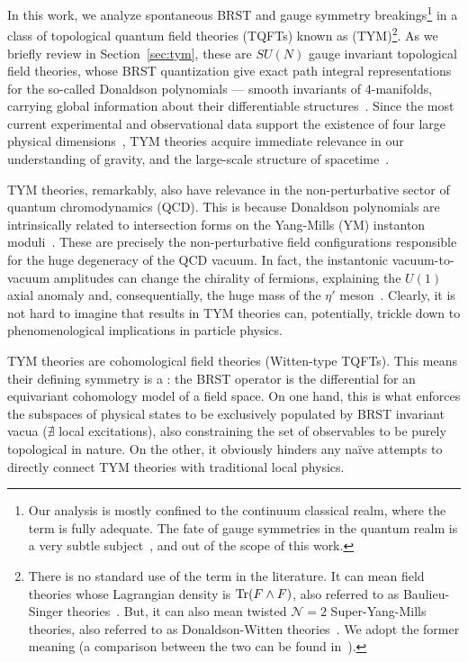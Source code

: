 \documentclass[../main.tex]{subfiles}
\begin{document}
In this work, we analyze spontaneous BRST and gauge symmetry breakings\footnote{Our analysis is mostly confined to the continuum classical realm, where the term  is fully adequate. The fate of gauge symmetries in the quantum realm is a very subtle subject~\cite{elitzur1975a,frohlich1980a,frohlich1981a,maas2019a}, and out of the scope of this work.} in a class of topological quantum field theories (TQFTs) known as  (TYM)\footnote{There is no standard use of the term  in the literature. It can mean field theories whose Lagrangian density is $\operatorname{Tr} (F \wedge F)$, also referred to as Baulieu-Singer theories~\cite{baulieu1988a}. But, it can also mean twisted $\mathcal{N}=2$ Super-Yang-Mills theories, also referred to as Donaldson-Witten theories~\cite{witten1988d,witten1991a}. We adopt the former meaning (a comparison between the two can be found in~\cite{junqueira2021a}).}. As we briefly review in Section~\ref{sec:tym}, these are $SU(N)$ gauge invariant topological field theories, whose BRST quantization give exact path integral representations for the so-called Donaldson polynomials --- smooth invariants of 4-manifolds, carrying global information about their differentiable structures~\cite{donaldson1983a,donaldson1990a,donaldson1990b,witten1988d,baulieu1988a,witten1991a}. Since the most current experimental and observational data support the existence of four large physical dimensions~\cite{lee2020a,wenhai2020a,chakravarti2020a,visinelli2018a,vagnozzi2019a}, TYM theories acquire immediate relevance in our understanding of gravity, and the large-scale structure of spacetime~\cite{witten1988a,brans1992,maluga1996,maluga2007}.

TYM theories, remarkably, also have relevance in the non-perturbative sector of quantum chromodynamics (QCD). This is because Donaldson polynomials are intrinsically related to intersection forms on the Yang-Mills (YM) instanton moduli~\cite{donaldson1983a,donaldson1990a,donaldson1990b}. These are precisely the non-perturbative field configurations responsible for the huge degeneracy of the QCD vacuum. In fact, the instantonic vacuum-to-vacuum amplitudes can change the chirality of fermions, explaining the $U(1)$ axial anomaly and, consequentially, the huge mass of the $\eta '$ meson~\cite{thooft1976a,thooft1986a}. Clearly, it is not hard to imagine that results in TYM theories can, potentially, trickle down to phenomenological implications in particle physics.

TYM theories are cohomological field theories (Witten-type TQFTs). This means their defining symmetry is a : the BRST operator is the differential for an equivariant cohomology model of a field space. On one hand, this is what enforces the subspaces of physical states to be exclusively populated by BRST invariant vacua ($\nexists$ local excitations), also constraining the set of observables to be purely topological in nature. On the other, it obviously hinders any naïve attempts to directly connect TYM theories with traditional local physics.
\end{document}

